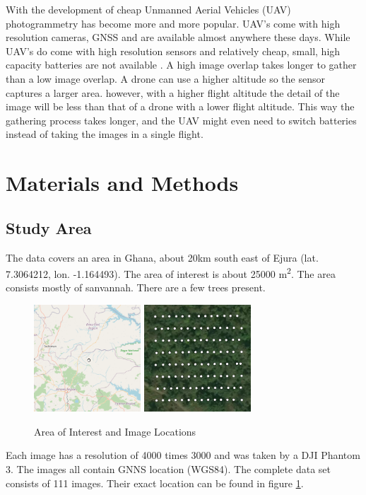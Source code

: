 \documentclass{isprs} %
\begin{document}
With the development of cheap Unmanned Aerial Vehicles (UAV) photogrammetry has become more and more popular. 
UAV's come with high resolution cameras, GNSS and are available almost anywhere these days.
While UAV's do come with high resolution sensors and relatively cheap, small, high capacity batteries are not available \citep{UAVpopularity}.
A high image overlap takes longer to gather than a low image overlap. 
A drone can use a higher altitude so the sensor captures a larger area.
however, with a higher flight altitude the detail of the image will be less than that of a drone with a lower flight altitude.
This way the gathering process takes longer, and the UAV might even need to switch batteries instead of taking the images in a single flight.


\section{Materials and Methods}

\subsection{Study Area}\label{sec:Study Area}
The data covers an area in Ghana, about 20km south east of Ejura (lat. 7.3064212, lon. -1.164493). 
The area of interest is about 25000 m\textsuperscript{2}. 
The area consists mostly of sanvannah.
There are a few trees present.
\begin{figure}[htp]
    \centering
    \includegraphics[width=4cm]{locationwide.png}
    \includegraphics[width=4cm]{locationzoom2.png}
    \caption{Area of Interest and Image Locations}
    \label{fig:areaofinterest}
\end{figure}
Each image has a resolution of 4000 times 3000 and was taken by a DJI Phantom 3.
The images all contain GNNS location (WGS84). 
The complete data set consists of 111 images.
Their exact location can be found in figure \ref{fig:areaofinterest}.
\end{document}
